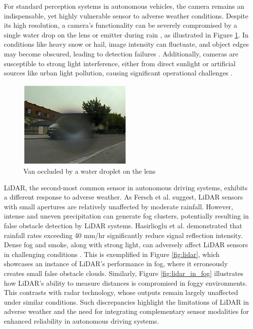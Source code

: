 \documentclass[report.tex]{subfiles}
\begin{document}
    For standard perception systems in autonomous vehicles, the camera remains an indispensable, yet highly vulnerable sensor to adverse weather conditions. Despite its high resolution, a camera's functionality can be severely compromised by a single water drop on the lens or emitter during rain \cite{mardirosian2021LiDAR}, as illustrated in Figure \ref{fig:camera_in_rain}. In conditions like heavy snow or hail, image intensity can fluctuate, and object edges may become obscured, leading to detection failures \cite{zang2019impact}. Additionally, cameras are susceptible to strong light interference, either from direct sunlight or artificial sources like urban light pollution, causing significant operational challenges \cite{acarballo2020libre}.

    \begin{figure}[h]
        \centering
        \includegraphics[width=0.5\textwidth]{images/rain_droplet.png}
        \caption{Van occluded by a water droplet on the lens \cite{Nobis2020May}}
        \label{fig:camera_in_rain}
    \end{figure}
    
    LiDAR, the second-most common sensor in autonomous driving systems, exhibits a different response to adverse weather. As Fersch et al. \cite{fersch2016influence} suggest, LiDAR sensors with small apertures are relatively unaffected by moderate rainfall. However, intense and uneven precipitation can generate fog clusters, potentially resulting in false obstacle detection by LiDAR systems. Hasirlioglu et al. \cite{hasirlioglu2016modeling} demonstrated that rainfall rates exceeding 40 mm/hr significantly reduce signal reflection intensity. Dense fog and smoke, along with strong light, can adversely affect LiDAR sensors in challenging conditions \cite{Zhang2021Dec, acarballo2020libre}. This is exemplified in Figure \ref{fig:lidar}, which showcases an instance of LiDAR's performance in fog, where it erroneously creates small false obstacle clouds. Similarly, Figure \ref{fig:lidar_in_fog} illustrates how LiDAR's ability to measure distances is compromised in foggy environments. This contrasts with radar technology, whose outputs remain largely unaffected under similar conditions. Such discrepancies highlight the limitations of LiDAR in adverse weather and the need for integrating complementary sensor modalities for enhanced reliability in autonomous driving systems.
\end{document}
